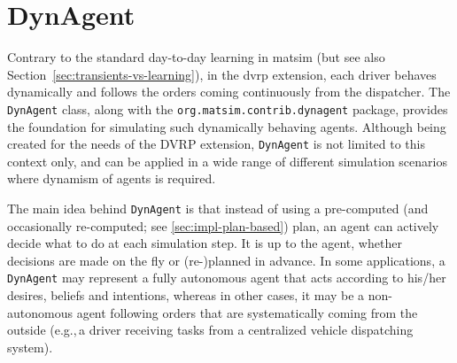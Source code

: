 \section{DynAgent}
\label{sec:dynAgent}
Contrary to the standard day-to-day learning in \gls{matsim} (but see also Section~\ref{sec:transients-vs-learning}), in the \gls{dvrp} extension, each driver behaves dynamically and follows the orders coming continuously from the dispatcher. The \lstinline$DynAgent$ class, along with the \lstinline$org.matsim.contrib.dynagent$ package, provides the foundation for simulating such dynamically behaving agents. Although  being created for the needs of the DVRP extension, \lstinline$DynAgent$ is not limited to this context only, and can be applied in a wide range of different simulation scenarios where dynamism of agents is required.

The main idea behind \lstinline$DynAgent$ is that instead of using a pre-computed (and occasionally re-computed; see \ref{sec:impl-plan-based}) plan, an agent can actively decide what to do at each simulation step. It is up to the agent, whether decisions are made on the fly or (re-)planned in advance. In some applications, a \lstinline$DynAgent$ may represent a fully autonomous agent that acts according to his/her desires, beliefs and intentions, whereas in other cases, it may be a non-autonomous agent following orders that are systematically coming from the outside (e.g.,\,a driver receiving tasks from a centralized vehicle dispatching system).

